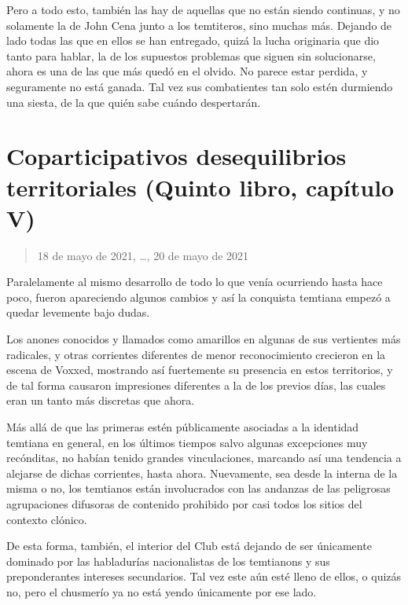 \documentclass[
]{book}
\begin{document}
Pero a todo esto, también las hay de aquellas que no están siendo continuas, y no solamente la de John Cena junto a los temtiteros, sino muchas más. Dejando de lado todas las que en ellos se han entregado, quizá la lucha originaria que dio tanto para hablar, la de los supuestos problemas que siguen sin solucionarse, ahora es una de las que más quedó en el olvido. No parece estar perdida, y seguramente no está ganada. Tal vez sus combatientes tan solo estén durmiendo una siesta, de la que quién sabe cuándo despertarán.

\hypertarget{coparticipativos-desequilibrios-territoriales-quinto-libro-capuxedtulo-v}{%
\section{Coparticipativos desequilibrios territoriales (Quinto libro, capítulo V)}\label{coparticipativos-desequilibrios-territoriales-quinto-libro-capuxedtulo-v}}

\begin{quote}
18 de mayo de 2021, \ldots, 20 de mayo de 2021
\end{quote}

Paralelamente al mismo desarrollo de todo lo que venía ocurriendo hasta hace poco, fueron apareciendo algunos cambios y así la conquista temtiana empezó a quedar levemente bajo dudas.

Los anones conocidos y llamados como amarillos en algunas de sus vertientes más radicales, y otras corrientes diferentes de menor reconocimiento crecieron en la escena de Voxxed, mostrando así fuertemente su presencia en estos territorios, y de tal forma causaron impresiones diferentes a la de los previos días, las cuales eran un tanto más discretas que ahora.

Más allá de que las primeras estén públicamente asociadas a la identidad temtiana en general, en los últimos tiempos salvo algunas excepciones muy recónditas, no habían tenido grandes vinculaciones, marcando así una tendencia a alejarse de dichas corrientes, hasta ahora. Nuevamente, sea desde la interna de la misma o no, los temtianos están involucrados con las andanzas de las peligrosas agrupaciones difusoras de contenido prohibido por casi todos los sitios del contexto clónico.

De esta forma, también, el interior del Club está dejando de ser únicamente dominado por las habladurías nacionalistas de los temtianons y sus preponderantes intereses secundarios. Tal vez este aún esté lleno de ellos, o quizás no, pero el chusmerío ya no está yendo únicamente por ese lado.
\end{document}

